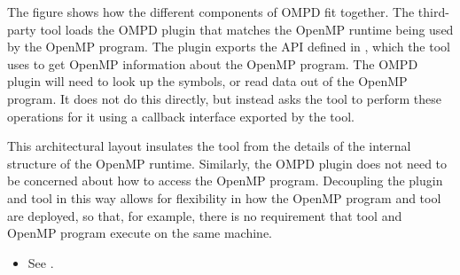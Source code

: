 The figure shows how the different components of OMPD fit together. The third-party tool loads
the OMPD plugin
that matches the OpenMP runtime being used by the OpenMP program. The
plugin exports the API defined in
, which the tool uses to get
OpenMP information about the
OpenMP program. The OMPD
plugin will need to look up the symbols, or read data out of the
OpenMP program. It does not do this directly,
but instead asks the tool to perform these operations
for it using a callback interface exported
by the tool.

This architectural layout insulates the tool from the details of the
internal structure of the
OpenMP runtime. Similarly, the OMPD plugin does not need to be
concerned about how to access
the OpenMP program. Decoupling the plugin and tool in this
way allows for flexibility in how the OpenMP program and tool are deployed, so that, for example,
there is no requirement that tool and OpenMP program
execute on the same machine.

\crossreferences
\begin{itemize}
\item See .
\end{itemize}

